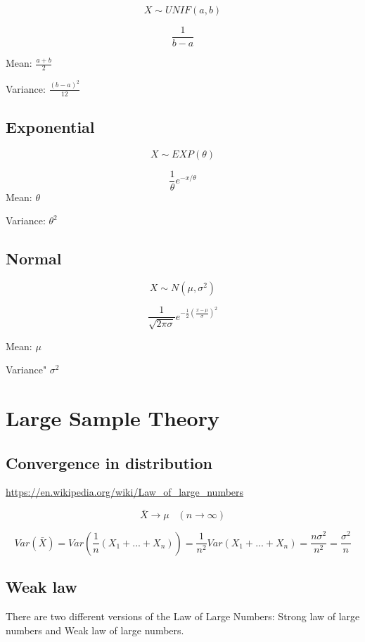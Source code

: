 \documentclass[]{book}
\begin{document}
\[X \sim UNIF(a,b)\]

\[\frac{1}{b-a}\]

Mean: \(\frac{a+b}{2}\)

Variance: \(\frac{(b-a)^2}{12}\)

\hypertarget{exponential}{%
\subsection{Exponential}\label{exponential}}

\[X \sim EXP(\theta)\]

\[\frac{1}{\theta} e^{-x/\theta}\]
Mean: \(\theta\)

Variance: \(\theta^2\)

\hypertarget{normal}{%
\subsection{Normal}\label{normal}}

\[X\sim N(\mu, \sigma^2)\]

\[\frac{1}{\sqrt{2 \pi \sigma}} e^{-\frac{1}{2}(\frac{x-\mu}{\sigma})^2}\]

Mean: \(\mu\)

Variance" \(\sigma^2\)

\hypertarget{large-sample-theory}{%
\section{Large Sample Theory}\label{large-sample-theory}}

\hypertarget{convergence-in-distribution}{%
\subsection{Convergence in distribution}\label{convergence-in-distribution}}

\url{https://en.wikipedia.org/wiki/Law_of_large_numbers}

\[\bar{X} \rightarrow \mu \; \; \; (n \rightarrow \infty)\]

\[Var(\bar{X})=Var(\frac{1}{n}(X_1+...+X_n))=\frac{1}{n^2}Var(X_1+...+X_n)=\frac{n \sigma^2}{n^2}=\frac{\sigma^2}{n}\]

\hypertarget{weak-law}{%
\subsection{Weak law}\label{weak-law}}

There are two different versions of the Law of Large Numbers: Strong law of large numbers and Weak law of large numbers.
\end{document}

